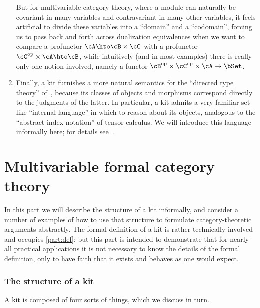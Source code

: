 \documentclass{amsart}
\newcommand{\A}{\cA}
\newcommand{\B}{\cB}
\newcommand{\C}{\cC}
\begin{document}
\begin{enumerate}
  But for multivariable category theory, where a module can naturally be covariant in many variables and contravariant in many other variables, it feels artificial to divide these variables into a ``domain'' and a ``codomain'', forcing us to pass back and forth across dualization equivalences when we want to compare a profunctor $\A \hto \B\times \C$ with a profunctor $\C\op\times \A \hto \B$, while intuitively (and in most examples) there is really only one notion involved, namely a functor $\B\op \times \C\op \times \A \to \bSet$.
\item Finally, a kit furnishes a more natural semantics for the ``directed type theory'' of~\cite{lnss:dirtt}, because its classes of objects and morphisms correspond directly to the judgments of the latter.
  In particular, a kit admits a very familiar set-like ``internal-language'' in which to reason about its objects, analogous to the ``abstract index notation'' of tensor calculus.
  We will introduce this language informally here; for details see~\cite{lnss:dirtt}.
\end{enumerate}

\part{Multivariable formal category theory}
\label{part:mfct}

In this part we will describe the structure of a kit informally, and consider a number of examples of how to use that structure to formulate category-theoretic arguments abstractly.
The formal definition of a kit is rather technically involved and occupies \cref{part:def}; but this part is intended to demonstrate that for nearly all practical applications it is not necessary to know the details of the formal definition, only to have faith that it exists and behaves as one would expect.

\section{The structure of a kit}
\label{sec:structure}

A kit is composed of four sorts of things, which we discuss in turn.
\end{document}
